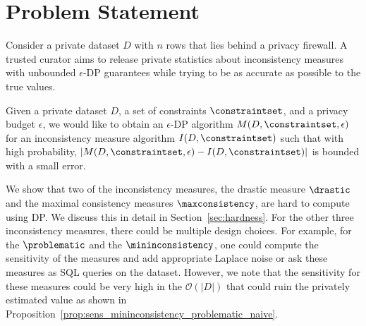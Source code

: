 \section{Problem Statement}\label{sec:problem}


Consider a private dataset $D$ with $n$ rows that lies behind a privacy firewall. A trusted curator aims to release private statistics about inconsistency measures with unbounded $\epsilon$-DP guarantees while trying to be as accurate as possible to the true values. 

\begin{problem}\label{prob:measure_dataset} 
Given a private dataset $D$, a set of constraints $\constraintset$, and a privacy budget $\epsilon$, we would like to obtain an $\epsilon$-DP algorithm $M(D, \constraintset, \epsilon)$ for an inconsistency measure algorithm $I(D, \constraintset)$  such that with high probability, $|M(D, \constraintset, \epsilon) - I(D, \constraintset)|$ is bounded with a small error. 
\end{problem}



We show that two of the inconsistency measures, the drastic measure $\drastic$ and the maximal consistency measures $\maxconsistency$, are hard  to compute using DP. We discuss this in detail in Section~\ref{sec:hardness}.
For the other three inconsistency measures, there could be multiple design choices. For example, for the $\problematic$ and the $\mininconsistency$, one could compute the sensitivity of the measures and add appropriate Laplace noise or ask these measures as SQL queries on the dataset. However, we note that the sensitivity for these measures could be very high in the $\mathcal{O}(|D|)$ that could ruin the privately estimated value as shown in Proposition~\ref{prop:sens_mininconsistency_problematic_naive}.

